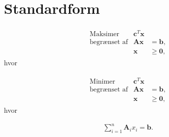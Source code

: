 \section{Standardform}
% 

\begin{align*}
\begin{array}{lrl}
\text{Maksimer}		&\textbf{c}^T\textbf{x}	&				\\
\text{begrænset af}	&\textbf{A}\textbf{x}	&=\mathbf{b},	\\
					&\mathbf{x}				&\geq \mathbf{0},		
\end{array}
\end{align*}
hvor 

\begin{align*}
\begin{array}{lrl}
\text{Minimer}		&\textbf{c}^T\textbf{x}	&				\\
\text{begrænset af}	&\textbf{A}\textbf{x}	&=\mathbf{b},	\\
					&\mathbf{x}				&\geq \mathbf{0},		
\end{array}
\end{align*}
hvor 

\begin{align*}
\sum^n_{i=1} \mathbf{A}_i x_i = \mathbf{b}.
\end{align*}
